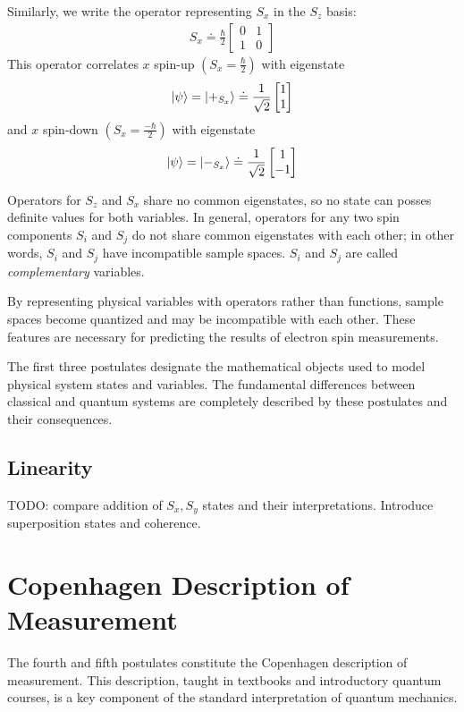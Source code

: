 Similarly, we write the operator representing $S_x$ in the $S_z$ basis:
\begin{align}
        S_x \doteq \frac{\hbar}{2}\begin{bmatrix} 0 & 1 \\ 1 & 0 \end{bmatrix}
\end{align}
This operator correlates $x$ spin-up $\left(S_x = \frac{\hbar}{2}\right)$ with eigenstate
\begin{align}
    \ket{\psi} = \ket{+_{S_x}} \doteq \frac{1}{\sqrt{2}}\begin{bmatrix} 1 \\ 1 \end{bmatrix}
\end{align}
and $x$ spin-down $\left(S_x = \frac{-\hbar}{2}\right)$ with eigenstate
\begin{align}
    \ket{\psi} = \ket{-_{S_x}} \doteq \frac{1}{\sqrt{2}}\begin{bmatrix} 1 \\ -1 \end{bmatrix}
\end{align}

Operators for $S_z$ and $S_x$ share no common eigenstates, so no state can posses definite values for both variables. In general, operators for any two spin components $S_i$ and $S_j$ do not share common eigenstates with each other; in other words, $S_i$ and $S_j$ have incompatible sample spaces. $S_i$ and $S_j$ are called \textit{complementary} variables.

By representing physical variables with operators rather than functions, sample spaces become quantized and may be incompatible with each other. These features are necessary for predicting the results of electron spin measurements.

The first three postulates designate the mathematical objects used to model physical system states and variables. The fundamental differences between classical and quantum systems are completely described by these postulates and their consequences.

\subsection{Linearity}
TODO: compare addition of $S_x, S_y$ states and their interpretations. Introduce superposition states and coherence.

\section{Copenhagen Description of Measurement}
The fourth and fifth postulates constitute the Copenhagen description of measurement. This description, taught in textbooks and introductory quantum courses, is a key component of the standard interpretation of quantum mechanics.

